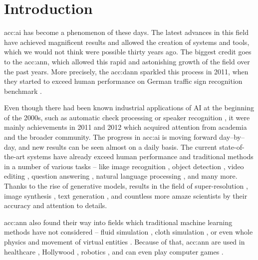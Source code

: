 \chapter{Introduction}
\label{chap:intro}

\acrfull{acc:ai} has become a phenomenon of these days. The latest advances in this field have achieved magnificent results and allowed the creation of systems and tools, which we would not think were possible thirty years ago. The biggest credit goes to the \acrfull{acc:ann}, which allowed this rapid and astonishing growth of the field over the past years. More precisely, the \acrfull{acc:dann} sparkled this process in 2011, when they started to exceed human performance on German traffic sign recognition benchmark \citep{CIRESAN2012333}.

Even though there had been known industrial applications of AI at the beginning of the 2000s, such as automatic check processing \citep{ChecksDocumentRecognition} or speaker recognition \citep{HECK2000181}, it were mainly achievements in 2011 and 2012 which acquired attention from academia and the broader community. The progress in \acrshort{acc:ai} is moving forward day--by--day, and new results can be seen almost on a daily basis. The current state-of-the-art systems have already exceed human performance and traditional methods in a number of various tasks -- like 
image recognition \citep{pham2021meta}\citep{ZawadzkaGosk2019},
object detection \citep{ghiasi2020simple}\citep{lehner2019patch},
video editing \citep{lu2020layered},
question answering \citep{zhang2020pushing}\citep{yamada2020luke},
natural language processing \citep{gpt3},
and many more. Thanks to the rise of generative models, results in the field of
super-resolution \citep{Sun_2020}\allowbreak\citep{Chadha_2020},
image synthesis \citep{StateOfTheArtImageSythesis}\allowbreak\citep{esser2020taming}\allowbreak\citep{dalle},
text generation \citep{gpt3}\allowbreak\citep{malmi2019encode},
and countless more amaze scientists by their accuracy and attention to details.

\acrshort{acc:ann} also found their way into fields which traditional machine learning methods have not considered -- fluid simulation \citep{um2018liquid}\citep{Kim_2019}, cloth simulation \citep{lee2019efficient}\citep{SRBO20}, or even whole physics \citep{PhysicsSimulation}\citep{sanchezgonzalez2020learning} and movement of virtual entities \citep{PhysicsBasedCharaterSImulation}\citep{zhang2020vid2player}. Because of that, \acrshort{acc:ann} are used in 
healthcare \citep{fakoor2013using}\allowbreak\citep{BreastCancerAISystem},
Hollywood \citep{aiinhollywood},
robotics \citep{pierson2017deep}\allowbreak\citep{Lee_2020},
and can even play computer games \citep{openai2019dota}\allowbreak\citep{alphastar}.

